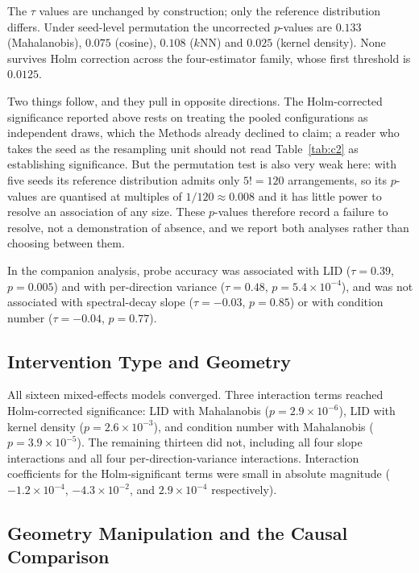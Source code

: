 The $\tau$ values are unchanged by construction; only the reference distribution
differs. Under seed-level permutation the uncorrected $p$-values are $0.133$
(Mahalanobis), $0.075$ (cosine), $0.108$ ($k$NN) and $0.025$ (kernel density).
None survives Holm correction across the four-estimator family, whose first
threshold is $0.0125$.

Two things follow, and they pull in opposite directions. The Holm-corrected
significance reported above rests on treating the pooled configurations as
independent draws, which the Methods already declined to claim; a reader who
takes the seed as the resampling unit should not read Table~\ref{tab:c2} as
establishing significance. But the permutation test is also very weak here: with
five seeds its reference distribution admits only $5! = 120$ arrangements, so its
$p$-values are quantised at multiples of $1/120 \approx 0.008$ and it has little
power to resolve an association of any size. These $p$-values therefore record a
failure to resolve, not a demonstration of absence, and we report both analyses
rather than choosing between them.

In the companion analysis, probe accuracy was associated with LID
($\tau = 0.39$, $p = 0.005$) and with per-direction variance
($\tau = 0.48$, $p = 5.4\times10^{-4}$), and was not associated with
spectral-decay slope ($\tau = -0.03$, $p = 0.85$) or with condition number
($\tau = -0.04$, $p = 0.77$).

\subsection{Intervention Type and Geometry}

All sixteen mixed-effects models converged. Three interaction terms reached
Holm-corrected significance: LID with Mahalanobis
($p = 2.9\times10^{-6}$), LID with kernel density ($p = 2.6\times10^{-3}$),
and condition number with Mahalanobis ($p = 3.9\times10^{-5}$). The
remaining thirteen did not, including all four slope interactions and all
four per-direction-variance interactions. Interaction coefficients for the
Holm-significant terms were small in absolute magnitude
($-1.2\times10^{-4}$, $-4.3\times10^{-2}$, and $2.9\times10^{-4}$
respectively).

\subsection{Geometry Manipulation and the Causal Comparison}

